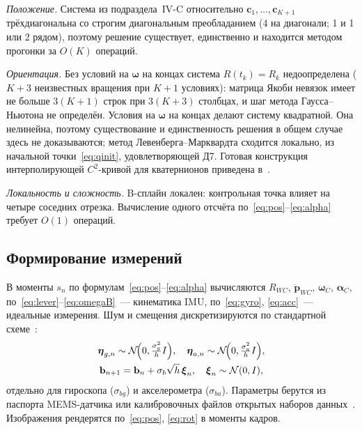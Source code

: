\documentclass{misisarticle}
\newcommand{\vb}[1]{\mathbf{#1}}
\begin{document}
\textit{Положение.} Система из подраздела~IV-C относительно $\vb c_1,\dots,\vb c_{K+1}$ трёхдиагональна со строгим диагональным преобладанием (4 на диагонали; 1 и 1 или 2 рядом), поэтому решение существует, единственно и находится методом прогонки за $O(K)$ операций.

\textit{Ориентация.} Без условий на $\boldsymbol\omega$ на концах система $R(t_k)=R_k$ недоопределена ($K+3$ неизвестных вращения при $K+1$ условиях): матрица Якоби невязок имеет не больше $3(K+1)$ строк при $3(K+3)$ столбцах, и шаг метода Гаусса--Ньютона не определён. Условия на $\boldsymbol\omega$ на концах делают систему квадратной. Она нелинейна, поэтому существование и единственность решения в общем случае здесь не доказываются; метод Левенберга--Марквардта сходится локально, из начальной точки~\eqref{eq:qinit}, удовлетворяющей Д7. Готовая конструкция интерполирующей $C^2$-кривой для кватернионов приведена в~\cite{kim95}.

\textit{Локальность и сложность.} B-сплайн локален: контрольная точка влияет на четыре соседних отрезка. Вычисление одного отсчёта по~\eqref{eq:pos}--\eqref{eq:alpha} требует $O(1)$ операций.

\subsection{Формирование измерений}

В моменты $s_n$ по формулам~\eqref{eq:pos}--\eqref{eq:alpha} вычисляются $R_{WC}$, $\ddot{\vb p}_{WC}$, $\boldsymbol\omega_C$, $\boldsymbol\alpha_C$, по~\eqref{eq:lever}--\eqref{eq:omegaB}~--- кинематика IMU, по~\eqref{eq:gyro}, \eqref{eq:acc}~--- идеальные измерения. Шум и смещения дискретизируются по стандартной схеме~\cite{furgale, forster}:
\begin{equation}
  \begin{gathered}
    \boldsymbol\eta_{g,n}\sim\mathcal N\!\Bigl(0,\tfrac{\sigma_g^2}{h}I\Bigr),\quad
    \boldsymbol\eta_{a,n}\sim\mathcal N\!\Bigl(0,\tfrac{\sigma_a^2}{h}I\Bigr),\\
    \vb b_{n+1}=\vb b_n+\sigma_b\sqrt h\,\boldsymbol\xi_n,\quad
    \boldsymbol\xi_n\sim\mathcal N(0,I),
  \end{gathered}
  \label{eq:noise}
\end{equation}
отдельно для гироскопа ($\sigma_{bg}$) и акселерометра ($\sigma_{ba}$). Параметры берутся из паспорта MEMS-датчика или калибровочных файлов открытых наборов данных~\cite{euroc}. Изображения рендерятся по~\eqref{eq:pos}, \eqref{eq:rot} в моменты кадров.
\end{document}
